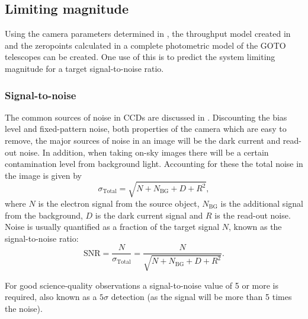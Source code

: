 \begin{colsection}
\begin{colsection}
\clearpage

\end{colsection}


\newpage
\subsection{Limiting magnitude}
\label{sec:lim_mag}
\begin{colsection}

Using the camera parameters determined in , the throughput model created in  and the zeropoints calculated in  a complete photometric model of the GOTO telescopes can be created. One use of this is to predict the system limiting magnitude for a target signal-to-noise ratio.

\subsubsection{Signal-to-noise}

The common sources of noise in CCDs are discussed in . Discounting the bias level and fixed-pattern noise, both properties of the camera which are easy to remove, the major sources of noise in an image will be the dark current and read-out noise. In addition, when taking on-sky images there will be a certain contamination level from background light. Accounting for these the total noise in the image is given by
%
\begin{equation}
    \sigma_\text{Total} = \sqrt{N + N_\text{BG} + D + R^2},
    \label{eq:total_noise}
\end{equation}
%
where $N$ is the electron signal from the source object, $N_\text{BG}$ is the additional signal from the background, $D$ is the dark current signal and $R$ is the read-out noise. Noise is usually quantified as a fraction of the target signal $N$, known as the signal-to-noise ratio:
%
\begin{equation}
    \text{SNR} = \frac{N}{\sigma_\text{Total}} = \frac{N}{\sqrt{N + N_\text{BG} + D + R^2}}.
    \label{eq:snr}
\end{equation}

For good science-quality observations a signal-to-noise value of 5 or more is required, also known as a $5\sigma$ detection (as the signal will be more than 5 times the noise).

\newpage


\end{colsection}
\end{colsection}
